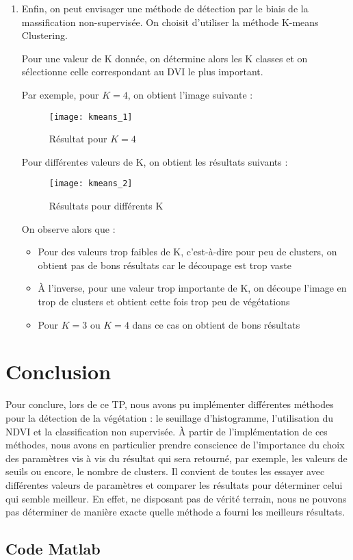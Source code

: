 \documentclass[12pt,a4paper,titlepage]{article}
\begin{document}
\begin{enumerate}
    \item{Enfin, on peut envisager une méthode de détection par le biais de la massification
        non-supervisée. On choisit d'utiliser la méthode K-means Clustering.

        Pour une valeur de K donnée, on détermine alors les K classes et on sélectionne
        celle correspondant au DVI le plus important.

        Par exemple, pour $K = 4$, on obtient l'image suivante :

        \begin{figure}[H]
            \caption{Résultat pour $K = 4$}
            \texttt{[image: kmeans\_1]}
            \centering
        \end{figure}

        Pour différentes valeurs de K, on obtient les résultats suivants :

        \begin{figure}[H]
            \caption{Résultats pour différents K}
            \texttt{[image: kmeans\_2]}
            \centering
        \end{figure}

        On observe alors que :

        \begin{itemize}
            \item{Pour des valeurs trop faibles de K, c'est-à-dire pour peu de clusters,
                on obtient pas de bons résultats car le découpage est trop vaste}
            \item{À l'inverse, pour une valeur trop importante de K, on découpe l'image
                en trop de clusters et obtient cette fois trop peu de végétations}
            \item{Pour $K = 3$ ou $K = 4$ dans ce cas on obtient de bons résultats}
        \end{itemize}
        }
\end{enumerate}

\section*{Conclusion}

Pour conclure, lors de ce TP, nous avons pu implémenter différentes méthodes pour la détection
de la végétation : le seuillage d'histogramme, l'utilisation du NDVI et la classification non
supervisée. À partir de l'implémentation de ces méthodes, nous avons en particulier prendre
conscience de l'importance du choix des paramètres vis à vis du résultat qui sera retourné, par
exemple, les valeurs de seuils ou encore, le nombre de clusters. Il convient de toutes les
essayer avec différentes valeurs de paramètres et comparer les résultats pour déterminer
celui qui semble meilleur. En effet, ne disposant pas de vérité terrain, nous ne pouvons
pas déterminer de manière exacte quelle méthode a fourni les meilleurs résultats.

\pagebreak

\begin{appendices}

    \section{Code Matlab}

    

\end{appendices}
\end{document}

